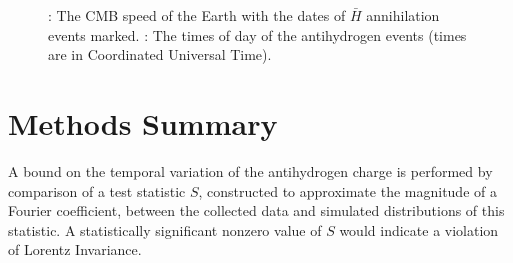 \documentclass[superscriptaddress,aps,prb,11pt]{revtex4-1}
\begin{document}
\begin{figure}
  \caption{: The CMB speed of the Earth with the dates of $\bar{H}$ annihilation events marked.  : The times of day of the antihydrogen events (times are in Coordinated Universal Time).
  }
  \label{fig:experimental_t_distributions}
\end{figure}

\section{Methods Summary}
A bound on the temporal variation of the antihydrogen charge is performed by comparison of a test statistic $S$, constructed to approximate the magnitude of a Fourier coefficient, between the collected data and simulated distributions of this statistic.  A statistically significant nonzero value of $S$ would indicate a violation of Lorentz Invariance.
\end{document}
